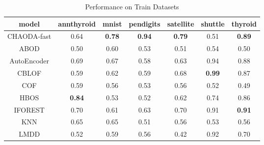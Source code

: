

\begin{table*}[!t]
\renewcommand{\arraystretch}{1.25}
\caption{Performance on Train Datasets}
\label{table:results:train-performance}
\centering
\begin{tabular}{|c|c|c|c|c|c|c|}
\hline
\textbf{model} & \textbf{annthyroid} & \textbf{mnist} & \textbf{pendigits} & \textbf{satellite} & \textbf{shuttle} & \textbf{thyroid} \\
\hline
    CHAODA-fast &                0.64 &  \textbf{0.78} &      \textbf{0.94} &      \textbf{0.79} &             0.51 &    \textbf{0.89} \\
\hline
            ABOD &                0.50 &           0.60 &               0.53 &               0.51 &             0.54 &             0.50 \\
\hline
    AutoEncoder &                0.69 &           0.67 &               0.58 &               0.63 &             0.94 &             0.88 \\
\hline
            CBLOF &                0.59 &           0.62 &               0.59 &               0.68 &    \textbf{0.99} &             0.87 \\
\hline
            COF &                0.59 &           0.56 &               0.53 &               0.56 &             0.52 &             0.49 \\
\hline
            HBOS &       \textbf{0.84} &           0.53 &               0.52 &               0.62 &             0.74 &             0.86 \\
\hline
        IFOREST &                0.70 &           0.61 &               0.63 &               0.70 &             0.91 &    \textbf{0.91} \\
\hline
            KNN &                0.65 &           0.65 &               0.51 &               0.56 &             0.53 &             0.56 \\
\hline
            LMDD &                0.52 &           0.59 &               0.56 &               0.42 &             0.92 &             0.70 \\

\end{tabular}
\end{table*}
